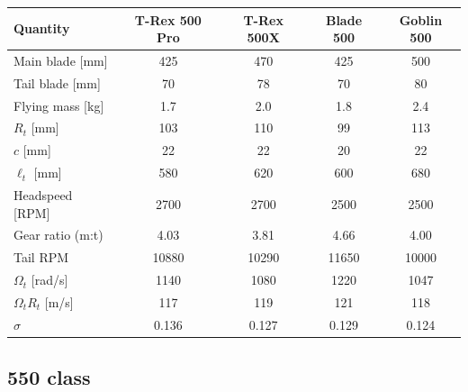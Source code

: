 \documentclass[11pt,a4paper]{article}
\newcommand{\OmegaT}{\Omega_t}
\newcommand{\Rt}{R_t}
\begin{document}
\begin{center}
\renewcommand{\arraystretch}{1.2}
\small
\begin{tabular}{lcccc}
\toprule
Quantity & T-Rex 500 Pro & T-Rex 500X & Blade 500 & Goblin 500 \\
\midrule
Main blade [mm]       & 425   & 470   & 425   & 500   \\
Tail blade [mm]       & 70    & 78    & 70    & 80    \\
Flying mass [kg]      & 1.7   & 2.0   & 1.8   & 2.4   \\
\(\Rt\) [mm]          & 103   & 110   & 99    & 113   \\
\(c\) [mm]            & 22    & 22    & 20    & 22    \\
\(\ell_t\) [mm]       & 580   & 620   & 600   & 680   \\
Headspeed [RPM]       & 2700  & 2700  & 2500  & 2500  \\
Gear ratio (m:t)      & 4.03  & 3.81  & 4.66  & 4.00  \\
Tail RPM              & 10880 & 10290 & 11650 & 10000 \\
\(\OmegaT\) [rad/s]   & 1140  & 1080  & 1220  & 1047  \\
\(\OmegaT\Rt\) [m/s]  & 117   & 119   & 121   & 118   \\
\(\sigma\)            & 0.136 & 0.127 & 0.129 & 0.124 \\
\bottomrule
\end{tabular}
\end{center}

\subsection{550 class}\label{app:cls550}
\end{document}
